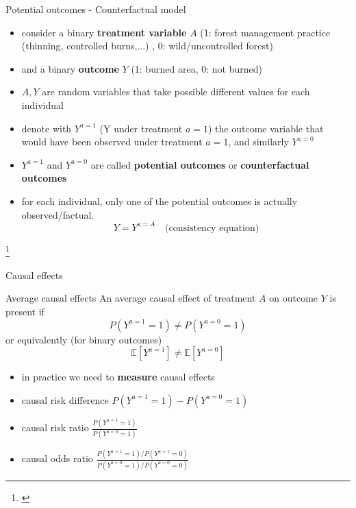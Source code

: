 \documentclass{beamer}
\newcommand\blfootnote[1]{%
  \begingroup
  \renewcommand\thefootnote{}\footnote{#1}%
  \addtocounter{footnote}{-1}%
  \endgroup
}
\begin{document}
\begin{frame}{Potential outcomes - Counterfactual model}
	\begin{itemize}
		\item consider a binary \textbf{treatment variable} $A$ 
			(1: forest management practice (thinning, controlled burns,...) , 0: wild/uncontrolled forest)    
		\item and a binary \textbf{outcome} $Y$ (1: burned area, 0: not burned) 
		\item $A,Y$ are random variables that take possible different values for each individual
		\item<2-> denote with $Y^{a=1}$ (Y under treatment $a=1$) the outcome variable that would have been observed under treatment $a=1$, and similarly $Y^{a=0}$ 
		\item<2-> $Y^{a=1}$ and $Y^{a=0}$ are called \textbf{potential outcomes} or \textbf{counterfactual outcomes} 
		\item<3-> for each individual, only one of the potential outcomes 
			is actually observed/factual. 
			\[ Y = Y^{a=A}  \quad \text{(consistency equation)} \]
	\end{itemize}
	\blfootnote{\citet{whatif, wasserman2004all}}

\end{frame}

\begin{frame}{Causal effects}
	\begin{definition}{Average causal effects}
		An average causal effect of treatment $A$ on outcome $Y$ is present if 
		\[ P(Y^{a=1} = 1) \neq   P(Y^{a=0} = 1) \]
		or equivalently (for binary outcomes)
		\[ \mathbb{E}[Y^{a=1}] \neq \mathbb{E}[Y^{a=0}] \]
	\end{definition}
	\begin{itemize}
		\item<2-> in practice we need to \textbf{measure} causal effects 
		\item<3-> {causal risk difference} $P(Y^{a=1} = 1) - P(Y^{a=0} = 1)$
		\item<4-> {causal risk ratio} $\frac{P(Y^{a=1} = 1)}{P(Y^{a=0} = 1)}$ 
		\item<5-> {causal odds ratio} $\frac{P(Y^{a=1} = 1) / P(Y^{a=1} = 0) }{P(Y^{a=0} = 1) / P(Y^{a=0} = 0)}$ 
	\end{itemize}
\end{frame}
\end{document}
